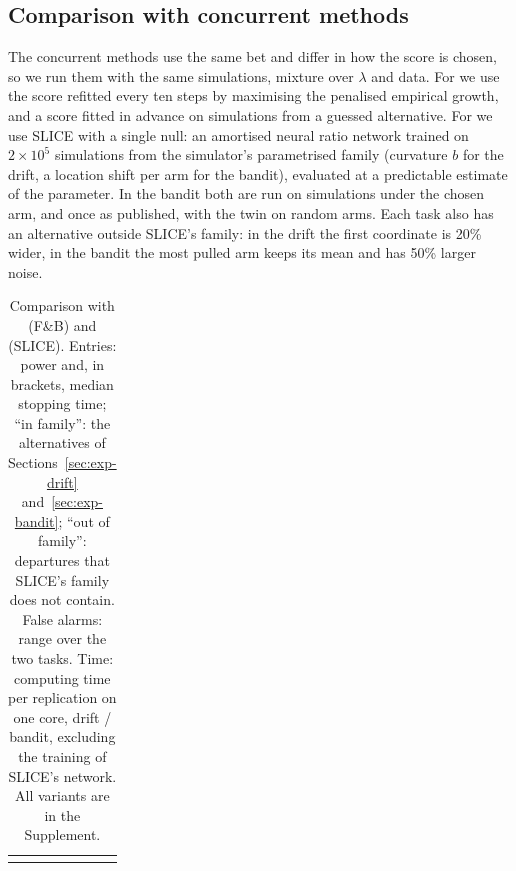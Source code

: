 \subsection{Comparison with concurrent methods}\label{sec:exp-concurrent}

The concurrent methods use the same bet and differ in how the score is
chosen, so we run them with the same simulations, mixture over $\lambda$ and
data. For \citet{forre2026anytime} we use the score refitted every ten steps by
maximising the penalised empirical growth, and a score fitted in advance on
simulations from a guessed alternative. For \citet{cortinovis2026slice} we use
SLICE with a single null: an amortised neural ratio network trained on
$2 \times 10^5$ simulations from the simulator's parametrised family
(curvature $b$ for the drift, a location shift per arm for the bandit),
evaluated at a predictable estimate of the parameter. In the bandit both are
run on simulations under the chosen arm, and once as published, with the twin
on random arms. Each task also has an alternative outside SLICE's family: in
the drift the first coordinate is 20\% wider, in the bandit the most pulled
arm keeps its mean and has 50\% larger noise.

%
\begin{table}[t]
\centering
\caption{Comparison with \citet{forre2026anytime} (F\&B) and
\citet{cortinovis2026slice} (SLICE). Entries: power and, in brackets, median
stopping time; ``in family'': the alternatives of
Sections~\ref{sec:exp-drift} and~\ref{sec:exp-bandit}; ``out of family'':
departures that SLICE's family does not contain. False alarms: range over the
two tasks. Time: computing time per replication on one core, drift / bandit,
excluding the training of SLICE's network. All variants are in the
Supplement.}
\label{tab:concurrent}
\small
\begin{tabular}{@{}c@{}}\resizebox{\textwidth}{!}{\usebox{\widetab}}\end{tabular}
\end{table}

